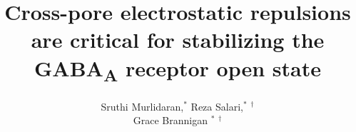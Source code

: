 \documentclass[12pt,onecolumn]{biophys}
\begin{document}
\title{Cross-pore electrostatic repulsions are critical for stabilizing the GABA\textsubscript{A} receptor open state}

\author{Sruthi Murlidaran,$^\ast$  Reza Salari,$^\ast$ $^\dagger$\\  Grace Brannigan $^\ast$ $^\dagger$\\}

\address{$^\ast$Center for Computational and Integrative Biology, Rutgers University-Camden, Camden, NJ 08102, $^\dagger$Department of Physics, Rutgers University-Camden, Camden, NJ 08102}

\newcommand{\GABAA}{GABA\textsubscript{A}R\xspace}
\newcommand{\avgr}{\bar{r}}
\newcommand{\varr}{\delta r^{2}}
\newcommand{\plgics}{pLGICs}
\newcommand{\nachr}{nAChR}

\begin{abstract}
{}
{}
{}
\end{abstract}

\maketitle

\end{document}
